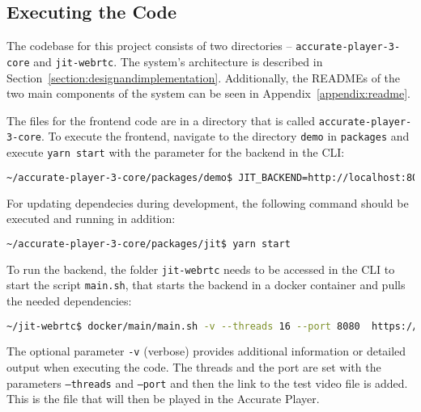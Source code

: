 \documentclass[../MasterThesis.tex]{subfiles}
\begin{document}
	
	
	
	
	
	








\subsection{Executing the Code} \label{subsection:runninghtecode}

The codebase for this project consists of two directories -- \texttt{accurate-player-3-core} and \texttt{jit-webrtc}. The system's architecture is described in Section~\ref{section:designandimplementation}. Additionally, the READMEs of the two main components of the system can be seen in Appendix~\ref{appendix:readme}.


The files for the frontend code are in a directory that is called \texttt{accurate-player-3-core}. To execute the frontend, navigate to the directory \texttt{demo} in \texttt{packages} and execute \texttt{yarn start} with the parameter for the backend in the CLI:
\begin{lstlisting}[language=bash, numbers=none]
	~/accurate-player-3-core/packages/demo$ JIT_BACKEND=http://localhost:8080 yarn start
\end{lstlisting}

For updating dependecies during development, the following command should be executed and running in addition: 
\begin{lstlisting}[language=bash, numbers=none]
	~/accurate-player-3-core/packages/jit$ yarn start
\end{lstlisting}



To run the backend, the folder \texttt{jit-webrtc} needs to be accessed in the CLI to start the script \texttt{main.sh}, that starts the backend in a docker container and pulls the needed dependencies:
\begin{lstlisting}[language=bash, numbers=none]
	~/jit-webrtc$ docker/main/main.sh -v --threads 16 --port 8080  https://s3.eu-central-1.amazonaws.com/accurate-player-demo-assets/timecode/sintel-2048-timecode-stereo.mp4
\end{lstlisting}

The optional parameter \texttt{-v} (verbose) provides additional information or detailed output when executing the code. The threads and the port are set with the parameters \texttt{--threads} and \texttt{--port} and then the link to the test video file is added. This is the file that will then be played in the Accurate Player.






	
	
	

	
	
\end{document}
